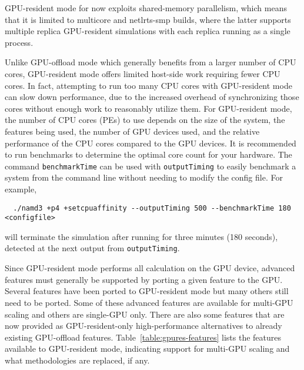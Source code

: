 GPU-resident mode for now exploits shared-memory parallelism,
which means that it is limited to multicore and netlrts-smp builds,
where the latter supports multiple replica GPU-resident simulations
with each replica running as a single process.

Unlike GPU-offload mode which generally benefits
from a larger number of CPU cores,
GPU-resident mode offers limited host-side work
requiring fewer CPU cores.
In fact, attempting to run too many CPU cores with GPU-resident mode
can slow down performance, due to the increased overhead of synchronizing
those cores without enough work to reasonably utilize them.
For GPU-resident mode, the number of CPU cores (PEs) to use
depends on the size of the system, the features being used,
the number of GPU devices used,
and the relative performance of the CPU cores compared to the GPU devices.
It is recommended to run benchmarks to determine the
optimal core count for your hardware.
The command \texttt{benchmarkTime} can be used with \texttt{outputTiming}
to easily benchmark a system from the command line without needing
to modify the config file. For example,
\begin{verbatim}
  ./namd3 +p4 +setcpuaffinity --outputTiming 500 --benchmarkTime 180 <configfile>
\end{verbatim}
will terminate the simulation after running for three minutes (180 seconds),
detected at the next output from \texttt{outputTiming}.

Since GPU-resident mode performs all calculation on the GPU device,
advanced features must generally be supported by porting a given
feature to the GPU.
Several features have been ported to GPU-resident mode
but many others still need to be ported.
Some of these advanced features are available for
multi-GPU scaling and others are single-GPU only.
There are also some features that are now provided as
GPU-resident-only high-performance alternatives to
already existing GPU-offload features.
Table~\ref{table:gpures-features} lists the features
available to GPU-resident mode, indicating support for multi-GPU scaling
and what methodologies are replaced, if any.

